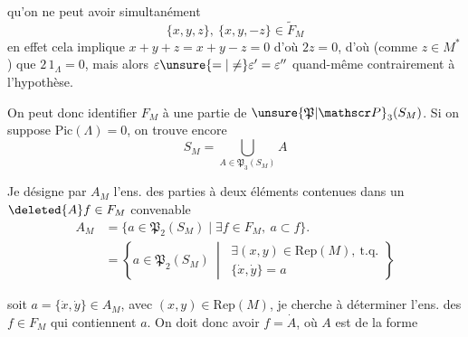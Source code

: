 qu'on ne peut avoir simultanément
\[
\{x,y,z\},\ \{x,y,-z\}\in\widetilde F_M
\]
en effet cela implique $x+y+z=x+y-z=0$ d'où $2z=0$, d'où (comme $z\in M^*$) que $2\,1_\Lambda=0$, mais alors $\varepsilon\unsure{=|\ne}\varepsilon'=\varepsilon''$ quand-même contrairement à l'hypothèse.

On peut donc identifier $F_M$ à une partie de $\unsure{\mathfrak P|\mathscr P}_3(S_M)$. Si on suppose \uline{$\mathrm{Pic}(\Lambda)=0$}, on trouve encore
\[
S_M=\bigcup_{A\in\mathfrak P_3(S_M)}A\tag*{(19)}
\]

Je désigne par $A_M$ l'ens. des parties à deux éléments  contenues dans un $\deleted{A}f\in F_M$ convenable
\[
\begin{aligned}
A_M&=\{a\in\mathfrak P_2(S_M)\mid\exists f\in F_M,\ a\subset f\}.\\
&=\left\{a\in\mathfrak P_2(S_M)\ \middle|\ 
\begin{gathered}\exists(x,y)\in\mathrm{Rep}(M),\ \text{t.q.}\\ \{\dot x,\dot y\}=a\end{gathered}\right\}
\end{aligned}\tag*{(20)}
\]
 

soit $a=\{\dot x,\dot y\}\in A_M$, avec $(x,y)\in\mathrm{Rep}(M)$, je cherche à déterminer l'ens. des $f\in F_M$ qui contiennent $a$. On doit donc avoir $f=\dot A$, où $A$ est de la forme
